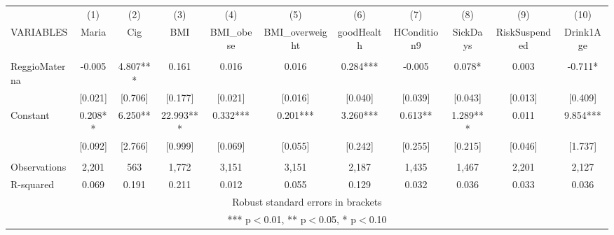 \begin{tabular}{lcccccccccc} \hline
 & (1) & (2) & (3) & (4) & (5) & (6) & (7) & (8) & (9) & (10) \\
VARIABLES & Maria & Cig & BMI & BMI\_obese & BMI\_overweight & goodHealth & HCondition9 & SickDays & RiskSuspended & Drink1Age \\ \hline
 &  &  &  &  &  &  &  &  &  &  \\
ReggioMaterna & -0.005 & 4.807*** & 0.161 & 0.016 & 0.016 & 0.284*** & -0.005 & 0.078* & 0.003 & -0.711* \\
 & [0.021] & [0.706] & [0.177] & [0.021] & [0.016] & [0.040] & [0.039] & [0.043] & [0.013] & [0.409] \\
Constant & 0.208** & 6.250** & 22.993*** & 0.332*** & 0.201*** & 3.260*** & 0.613** & 1.289*** & 0.011 & 9.854*** \\
 & [0.092] & [2.766] & [0.999] & [0.069] & [0.055] & [0.242] & [0.255] & [0.215] & [0.046] & [1.737] \\
 &  &  &  &  &  &  &  &  &  &  \\
Observations & 2,201 & 563 & 1,772 & 3,151 & 3,151 & 2,187 & 1,435 & 1,467 & 2,201 & 2,127 \\
 R-squared & 0.069 & 0.191 & 0.211 & 0.012 & 0.055 & 0.129 & 0.032 & 0.036 & 0.033 & 0.036 \\ \hline
\multicolumn{11}{c}{ Robust standard errors in brackets} \\
\multicolumn{11}{c}{ *** p$<$0.01, ** p$<$0.05, * p$<$0.10} \\
\end{tabular}
